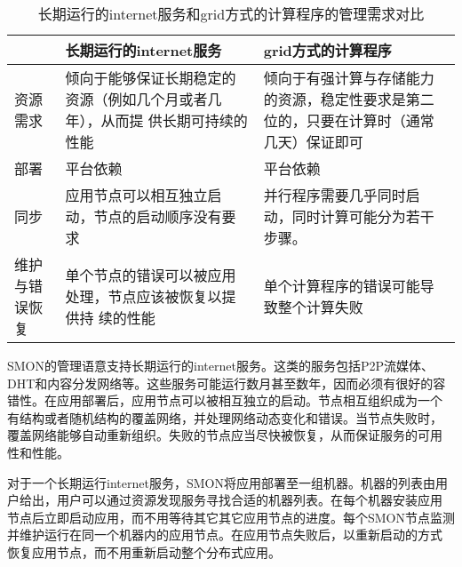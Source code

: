\begin{table*}[bthp]
\small
\centering
\caption{长期运行的internet服务和grid方式的计算程序的管理需求对比}
\label{fig:app-man-req}
\begin{tabular}{lp{5cm}p{5cm}}

\toprule[1.5pt]

 & 长期运行的internet服务 & grid方式的计算程序 \\

\midrule[1pt]

资源需求 & 

倾向于能够保证长期稳定的资源（例如几个月或者几年），从而提
供长期可持续的性能 

& 倾向于有强计算与存储能力的资源，稳定性要求是第二
位的，只要在计算时（通常几天）保证即可 \\

\midrule[1pt]

部署 & 平台依赖 & 平台依赖 \\

\midrule[1pt]

同步 & 应用节点可以相互独立启动，节点的启动顺序没有要求

& 并行程序需要几乎同时启动，同时计算可能分为若干步骤。\\
\midrule[1pt]

维护与错误恢复 

& 单个节点的错误可以被应用处理，节点应该被恢复以提供持
续的性能 

&
单个计算程序的错误可能导致整个计算失败 \\

\bottomrule[1.5pt]

\end{tabular}
\end{table*}

SMON的管理语意支持长期运行的internet服务。这类的服务包括P2P流媒体、
DHT和内容分发网络等。这些服务可能运行数月甚至数年，因而必须有很好的容
错性。在应用部署后，应用节点可以被相互独立的启动。节点相互组织成为一个
有结构或者随机结构的覆盖网络，并处理网络动态变化和错误。当节点失败时，
覆盖网络能够自动重新组织。失败的节点应当尽快被恢复，从而保证服务的可用
性和性能。

对于一个长期运行internet服务，SMON将应用部署至一组机器。机器的列表由用
户给出，用户可以通过资源发现服务寻找合适的机器列表。在每个机器安装应用
节点后立即启动应用，而不用等待其它其它应用节点的进度。每个SMON节点监测
并维护运行在同一个机器内的应用节点。在应用节点失败后，以重新启动的方式
恢复应用节点，而不用重新启动整个分布式应用。

